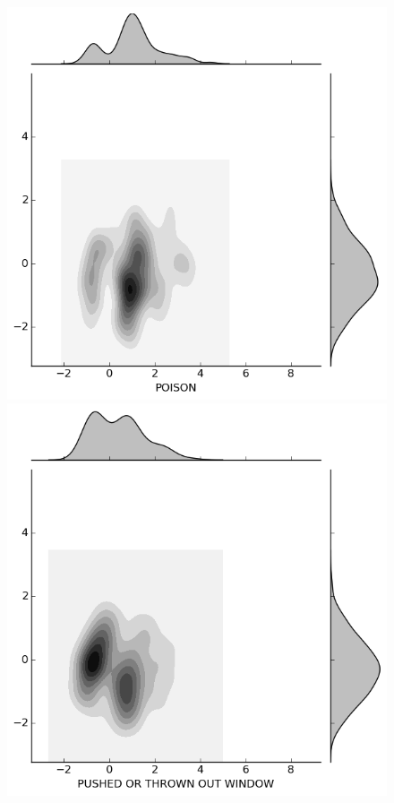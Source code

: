 \begin{figure}[H]
  \begin{minipage}[b]{0.20\linewidth}
    \includegraphics[width=\linewidth]{images/weapon/POISON.png}
  \end{minipage}
  \quad
  \begin{minipage}[b]{0.20\linewidth}
    \includegraphics[width=\linewidth]{images/weapon/PUSHED_OUT_WINDOW.png}

\end{minipage}
\end{figure}
